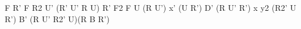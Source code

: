 F R' F R2 U' (R' U' R U) R' F2
F U (R U') x' (U R') D' (R U' R') x
y2 (R2' U R') B' (R U' R2' U)(R B R')
